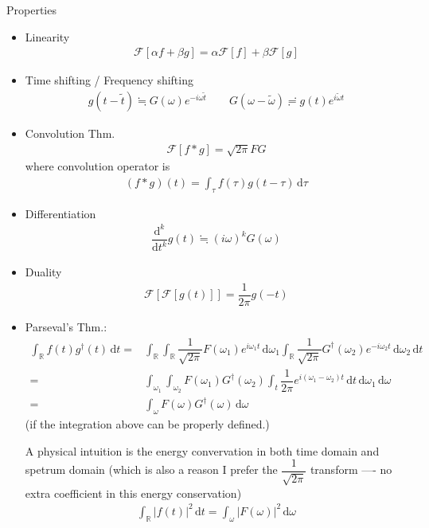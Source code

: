 Properties
\begin{itemize}[topsep=2pt,itemsep=0pt]
    \item Linearity
    \begin{align}
        \mathscr{F}\left[ \alpha f+\beta g \right] = \alpha \mathscr{F}\left[ f \right] +\beta \mathscr{F}\left[ g \right]  
    \end{align}
    \item Time shifting / Frequency shifting
    \begin{align}
        g(t-\tilde{t})\fallingdotseq G(\omega )e^{-i\omega \tilde{t}}  \qquad G(\omega -\tilde{\omega })\risingdotseq g(t)e^{i\tilde{\omega }t}
    \end{align}
    \item Convolution Thm.
    \begin{align}
        \mathscr{F}\left[ f*g \right]  = \sqrt{2\pi} FG 
    \end{align}
    where convolution operator is
    \begin{align}
        (f*g)(t)=\int _\tau f(\tau)g(t-\tau) \,\mathrm{d}\tau
    \end{align}
    \item Differentiation
    \begin{align}
        \dfrac{\mathrm{d}^{k} }{\mathrm{d}t^{k}} g(t) \fallingdotseq (i\omega )^k G(\omega )
    \end{align}
    \item Duality
    \begin{align}
        \mathscr{F}\left[ \mathscr{F}\left[ g(t) \right]  \right] = \dfrac{1}{2\pi} g(-t)  
    \end{align}
    \item Parseval's Thm.:
    \begin{align}\label{EqaParsevalThm}
        \int _\mathbb{R}f(t)g^\dagger (t) \,\mathrm{d}t =& \int _\mathbb{R} \int _\mathbb{R}\dfrac{1}{\sqrt{2\pi}}F(\omega _1)e^{i\omega _1t} \,\mathrm{d}\omega _1 \int _\mathbb{R}\dfrac{1}{\sqrt{2\pi}}G^\dagger(\omega _2)e^{-i\omega _2t} \,\mathrm{d}\omega _2 \,\mathrm{d}t\\
        =&\int_{\omega _1} \int_{ \omega _2} F(\omega _1)G^\dagger(\omega _2)\int _t \dfrac{1}{2\pi} e^{i(\omega _1-\omega _2)t} \,\mathrm{d}t \,\mathrm{d}\omega _1 \,\mathrm{d}\omega\\
        =&\int_\omega F(\omega )G^\dagger(\omega )\,\mathrm{d}\omega
    \end{align}
    (if the integration above can be properly defined.)

    A physical intuition is the energy convervation in both time domain and spetrum domain (which is also a reason I prefer the $ \dfrac{1}{\sqrt{2\pi}} $ transform ---- no extra coefficient in this energy conservation)
    \begin{align}
        \int_{\mathbb{R}} \left| f(t) \right|^2\,\mathrm{d}t = \int_\omega \left|F(\omega )\right|^2 \,\mathrm{d}\omega 
    \end{align}
    
       
    
\end{itemize}


